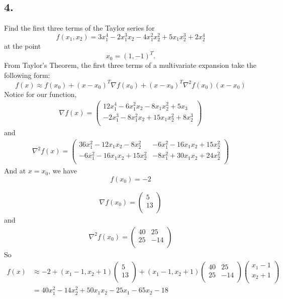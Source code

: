 \documentclass{article}
\begin{document}
\subsection*{4.} Find the first three terms of the Taylor series for 
\[f(x_1, x_2) = 3x_1^4 - 2x_1^3x_2 - 4x_1^2x_2^2 + 5x_1x_2^3 + 2x_2^4\]
at the point
\[x_0 = (1, -1)^T.\]
From Taylor's Theorem, the first three terms of a multivariate expansion take the following form:
\[f(x) \approx f(x_0) + (x - x_0)^T\nabla f(x_0) + (x - x_0)^T\nabla^2f(x_0)(x - x_0)\]
Notice for our function,
\begin{align*}
    \nabla f(x) = \begin{pmatrix}
        12x_1^4 - 6x_1^2x_2 - 8x_1x_2^2 + 5x_3 \\
        -2x_1^3 - 8x_1^2x_2 + 15x_1x_2^2 + 8x_2^3 \\
    \end{pmatrix}
\end{align*}
and 
\begin{align*}
    \nabla^2f(x) = \begin{pmatrix}
        36x_1^2 - 12x_1x_2 - 8x_2^2 & -6x_1^2 - 16x_1x_2 + 15x_2^2 \\
        -6x_1^2 - 16x_1x_2 + 15x_2^2 & -8x_1^2 + 30x_1x_2 + 24x_2^2 \\
    \end{pmatrix}
\end{align*}
And at $x = x_0$, we have
\[f(x_0) = -2\]

\begin{align*}
    \nabla f(x_0) = \begin{pmatrix}
        5 \\
        13 \\
    \end{pmatrix}
\end{align*}
and
\begin{align*}
    \nabla^2f(x_0) = \begin{pmatrix}
        40 & 25 \\
        25 & -14 \\
    \end{pmatrix}
\end{align*}
So 
\begin{align*}
    f(x) &\approx -2 + (x_1 - 1, x_2 + 1)\begin{pmatrix}
        5 \\
        13 \\
    \end{pmatrix}
    + (x_1 - 1, x_2 + 1)\begin{pmatrix}
        40 & 25 \\
        25 & -14 \\
    \end{pmatrix}
    \begin{pmatrix}
        x_1 - 1 \\
        x_2 + 1 \\
    \end{pmatrix} \\
    &= 40x_1^2 - 14x_2^2 + 50x_1x_2 - 25x_1 - 65x_2 - 18 \\
\end{align*}
\end{document}
